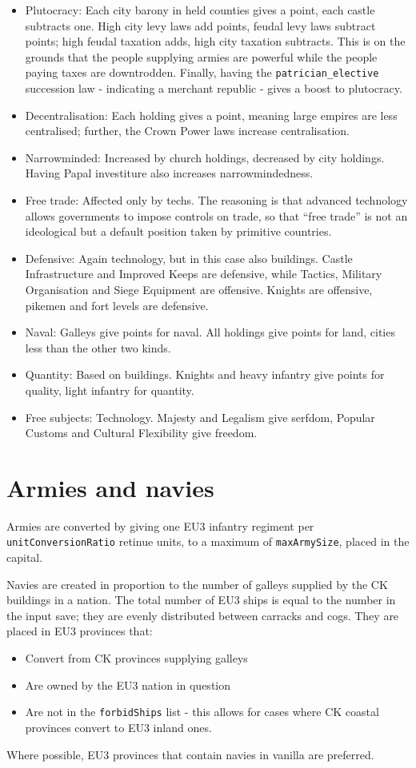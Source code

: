 \documentclass[12pt,ebook,oneside]{book}
\begin{document}
\begin{itemize}
\item Plutocracy: Each city barony in held counties gives a point, each castle
  subtracts one. High city levy laws add points, feudal levy laws subtract
  points; high feudal taxation adds, high city taxation
  subtracts. This is on the grounds that the people supplying armies are
  powerful while the people paying taxes are downtrodden. Finally,
  having the \verb|patrician_elective| succession law - indicating a
  merchant republic - gives a boost to plutocracy. 
\item Decentralisation: Each holding gives a point, meaning large
  empires are less centralised; further, the Crown Power laws increase
  centralisation. 
\item Narrowminded: Increased by church holdings, decreased by city
  holdings. Having Papal investiture also increases narrowmindedness. 
\item Free trade: Affected only by techs. The reasoning is that
  advanced technology allows governments to impose controls on trade,
  so that ``free trade'' is not an ideological but a default position
  taken by primitive countries. 
\item Defensive: Again technology, but in this case also buildings. Castle Infrastructure and Improved
  Keeps are defensive, while Tactics, Military Organisation and Siege
  Equipment are offensive. Knights are offensive, pikemen and fort
  levels are defensive. 
\item Naval: Galleys give points for naval. All holdings give points
  for land, cities less than the other two kinds. 
\item Quantity: Based on buildings. Knights and heavy infantry give
  points for quality, light infantry for quantity. 
\item Free subjects: Technology. Majesty and Legalism give serfdom,
  Popular Customs and Cultural Flexibility give freedom. 
\end{itemize}

\section{Armies and navies}

Armies are converted by giving one EU3 infantry regiment per
\verb|unitConversionRatio| retinue units, to a maximum of
\verb|maxArmySize|, placed in the capital. 

Navies are created in proportion to the number of galleys supplied by
the CK buildings in a nation. The total number of EU3 ships is equal
to the number in the input save; they are evenly distributed
between carracks and cogs. They are placed in EU3 provinces that:
\begin{itemize}
\item Convert from CK provinces supplying galleys
\item Are owned by the EU3 nation in question
\item Are not in the \verb|forbidShips| list - this allows for cases
  where CK coastal provinces convert to EU3 inland ones.
\end{itemize}
Where possible, EU3 provinces that contain navies in vanilla are
preferred. 
\end{document}
